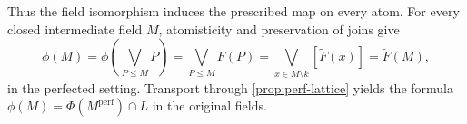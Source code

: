 \documentclass[11pt,oneside]{article}
\theoremstyle{definition}
\theoremstyle{remark}
\newcommand{\acl}{\operatorname{acl}}
\newcommand{\lean}[1]{\nolinkurl{#1}}
\begin{document}
Thus the field isomorphism induces the prescribed map on every atom.  For every closed
intermediate field $M$, atomisticity and preservation of joins give
\[
 \phi(M)=\phi\!\left(\bigvee_{P\leq M}P\right)
 =\bigvee_{P\leq M}F(P)
 =\bigvee_{x\in M\setminus k}[\widetilde F(x)]
 =\widetilde F(M),
\]
in the perfected setting.  Transport through \cref{prop:perf-lattice} yields the formula
$\phi(M)=\Phi(M^{\mathrm{perf}})\cap L$ in the original fields.

\end{document}
